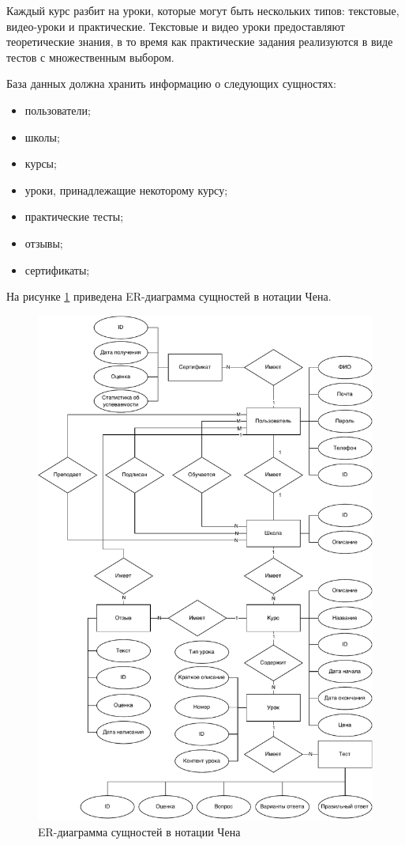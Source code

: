 Каждый курс разбит на уроки, которые могут быть нескольких типов: текстовые, видео-уроки и практические.
Текстовые и видео уроки предоставляют теоретические знания, в то время как практические задания
реализуются в виде тестов с множественным выбором.

База данных должна хранить информацию о следующих сущностях:
\begin{itemize}
    \item пользователи;
    \item школы;
    \item курсы;
    \item уроки, принадлежащие некоторому курсу;
    \item практические тесты;
    \item отзывы;
    \item сертификаты;
\end{itemize}

На рисунке \ref{img:er} приведена ER-диаграмма сущностей в нотации Чена.

\begin{figure}[H]
	\centering
	\includegraphics[height=0.35\textheight]{inc/img/er.pdf}
	\caption{ER-диаграмма сущностей в нотации Чена}
	\label{img:er}
\end{figure}

